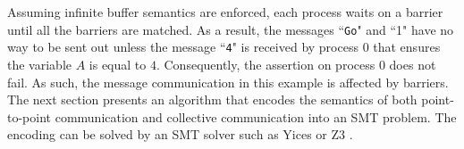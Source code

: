 Assuming infinite buffer semantics are enforced, each process waits on a barrier until all the barriers are matched. As a result, the messages ``\texttt{Go}" and ``1" have no way to be sent out unless the message ``\texttt{4}" is received by process $0$ that ensures the variable $A$ is equal to $4$. Consequently, the assertion on process $0$ does not fail. As such, the message communication in this example is affected by barriers. The next section presents an algorithm that encodes the semantics of both point-to-point communication and collective communication into an SMT problem. The encoding can be solved by an SMT solver such as Yices \cite{dutertre:CAV06} or Z3 \cite{demoura:tacas08}.





